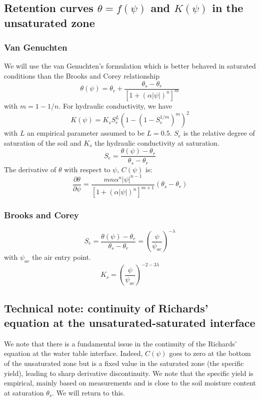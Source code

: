 \documentclass{article}
\begin{document}
\subsection{Retention curves $\theta=f(\psi)$ and $K(\psi)$ in the unsaturated zone}
\label{SoilMoisture:Retention_Curves}
\subsubsection{Van Genuchten}
We will use the van Genuchten's formulation which is better behaved in saturated conditions than the Brooks and Corey relationship 
\begin{equation}
     \theta(\psi) = \theta_r + \frac{\theta_s - \theta_r}{\left[ 1+(\alpha |\psi|)^n \right]^{m}}
\end{equation}
with $m=1-1/n$.
For hydraulic conductivity, we have
\begin{equation}
     K(\psi) = K_{s} S_e^L \left (1 -  (1-S_e^{1/m})^m  \right)^2
\end{equation}
with $L$ an empirical parameter assumed to be $L=0.5$. $S_e$ is the relative degree of saturation of the soil and $K_{s}$ the hydraulic conductivity at saturation. 
\begin{equation}
     S_e = \frac{\theta(\psi) - \theta_r}{\theta_s - \theta_r}
\end{equation}
The derivative of $\theta$ with respect to $\psi$, $C(\psi)$ is:
\begin{equation}
     \frac{\partial \theta}{\partial \psi} =   \frac{m n\alpha^n |\psi|^{n-1}}{\left[ 1+(\alpha |\psi|)^n \right]^{m+1}} \left( \theta_s - \theta_r \right) 
\end{equation}



\subsubsection{Brooks and Corey}
\begin{equation}
     S_e = \frac{\theta(\psi) - \theta_r}{\theta_s - \theta_r} = \left( \frac{\psi}{\psi_{ae}}\right)^{-\lambda}
\end{equation}
with $\psi_{ae}$ the air entry point.
\begin{equation}
     K_s = \left( \frac{\psi}{\psi_{ae}}\right)^{-2-3\lambda}
\end{equation}





\subsection{Technical note: continuity of Richards' equation at the unsaturated-saturated interface}
We note that there is a fundamental issue in the continuity of the Richards' equation at the water table interface. Indeed, $C(\psi)$ goes to zero at the bottom of the unsaturated zone but is a fixed value in the saturated zone (the specific yield), leading to sharp derivative discontinuity. We note that the specific yield is empirical, mainly based on measurements and is close to the soil moisture content at saturation $\theta_s$. We will return to this.
\end{document}
